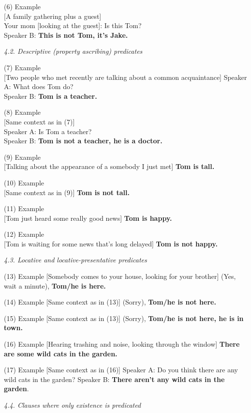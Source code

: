 \documentclass[output=paper]{langsci/langscibook}
\begin{document}
\begin{unindented}
(6) Example\\
{}[A family gathering plus a guest]\\
Your mom [looking at the guest]: Is this Tom?\\
Speaker B: \textbf{This is not Tom, it's Jake.}

\textit{4.2. Descriptive (property ascribing) predicates}

(7) Example\\
{}[Two people who met recently are talking about a common acquaintance]
Speaker A: What does Tom do?\\
Speaker B: \textbf{Tom is a teacher.}

(8) Example\\
{}[Same context as in (7)]\\
Speaker A: Is Tom a teacher?\\
Speaker B: \textbf{Tom is not a teacher, he is a doctor.}

(9) Example\\
{}[Talking about the appearance of a somebody I just met] \textbf{Tom is
tall.}

(10) Example\\
{}[Same context as in (9)] \textbf{Tom is not tall.}

(11) Example\\
{}[Tom just heard some really good news] \textbf{Tom is happy.}

(12) Example\\
{}[Tom is waiting for some news that's long delayed] \textbf{Tom is not
happy.}

\textit{4.3. Locative and locative-presentative predicates} 

(13) Example
{}[Somebody comes to your house, looking for your brother] (Yes, wait a
minute), \textbf{Tom/he is here.} 

(14) Example
{}[Same context as in (13)] (Sorry), \textbf{Tom/he is not
here.} 

(15) Example
{}[Same context as in (13)] (Sorry), \textbf{Tom/he is not
here, he is in town.} 

(16) Example
{}[Hearing trashing and noise, looking through the window] \textbf{There
are some wild cats in the garden.} 

(17) Example
{}[Same context as in (16)] Speaker A: Do you think there are
any wild cats in the garden? Speaker B: \textbf{There aren’t any wild cats
in the garden}. 

\textit{4.4. Clauses where only existence is predicated} 


\end{unindented}
\end{document}
